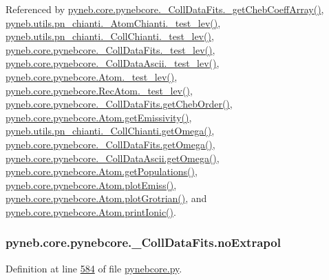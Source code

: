 Referenced by \hyperlink{pynebcore_8py_source_l00751}{pyneb.\-core.\-pynebcore.\-\_\-\-Coll\-Data\-Fits.\-\_\-get\-Cheb\-Coeff\-Array()}, \hyperlink{pn__chianti_8py_source_l00304}{pyneb.\-utils.\-pn\-\_\-chianti.\-\_\-\-Atom\-Chianti.\-\_\-test\-\_\-lev()}, \hyperlink{pn__chianti_8py_source_l00472}{pyneb.\-utils.\-pn\-\_\-chianti.\-\_\-\-Coll\-Chianti.\-\_\-test\-\_\-lev()}, \hyperlink{pynebcore_8py_source_l00677}{pyneb.\-core.\-pynebcore.\-\_\-\-Coll\-Data\-Fits.\-\_\-test\-\_\-lev()}, \hyperlink{pynebcore_8py_source_l01045}{pyneb.\-core.\-pynebcore.\-\_\-\-Coll\-Data\-Ascii.\-\_\-test\-\_\-lev()}, \hyperlink{pynebcore_8py_source_l01525}{pyneb.\-core.\-pynebcore.\-Atom.\-\_\-test\-\_\-lev()}, \hyperlink{pynebcore_8py_source_l02672}{pyneb.\-core.\-pynebcore.\-Rec\-Atom.\-\_\-test\-\_\-lev()}, \hyperlink{pynebcore_8py_source_l00711}{pyneb.\-core.\-pynebcore.\-\_\-\-Coll\-Data\-Fits.\-get\-Cheb\-Order()}, \hyperlink{pynebcore_8py_source_l01782}{pyneb.\-core.\-pynebcore.\-Atom.\-get\-Emissivity()}, \hyperlink{pn__chianti_8py_source_l00507}{pyneb.\-utils.\-pn\-\_\-chianti.\-\_\-\-Coll\-Chianti.\-get\-Omega()}, \hyperlink{pynebcore_8py_source_l00828}{pyneb.\-core.\-pynebcore.\-\_\-\-Coll\-Data\-Fits.\-get\-Omega()}, \hyperlink{pynebcore_8py_source_l01082}{pyneb.\-core.\-pynebcore.\-\_\-\-Coll\-Data\-Ascii.\-get\-Omega()}, \hyperlink{pynebcore_8py_source_l01562}{pyneb.\-core.\-pynebcore.\-Atom.\-get\-Populations()}, \hyperlink{pynebcore_8py_source_l02384}{pyneb.\-core.\-pynebcore.\-Atom.\-plot\-Emiss()}, \hyperlink{pynebcore_8py_source_l02443}{pyneb.\-core.\-pynebcore.\-Atom.\-plot\-Grotrian()}, and \hyperlink{pynebcore_8py_source_l02233}{pyneb.\-core.\-pynebcore.\-Atom.\-print\-Ionic()}.

\hypertarget{classpyneb_1_1core_1_1pynebcore_1_1___coll_data_fits_a97b30abb66948d40dc2077a3c3b15231}{
\subsubsection[{no\-Extrapol}]{\setlength{\rightskip}{0pt plus 5cm}pyneb.\-core.\-pynebcore.\-\_\-\-Coll\-Data\-Fits.\-no\-Extrapol}}\label{classpyneb_1_1core_1_1pynebcore_1_1___coll_data_fits_a97b30abb66948d40dc2077a3c3b15231}


Definition at line \hyperlink{pynebcore_8py_source_l00584}{584} of file \hyperlink{pynebcore_8py_source}{pynebcore.\-py}.



